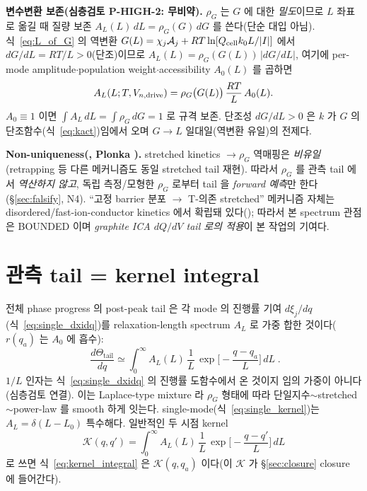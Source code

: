 \textbf{변수변환 보존(심층검토 P-HIGH-2: 무비약).} $\rho_G$ 는 $G$ 에 대한 \emph{밀도}이므로 $L$ 좌표로
옮길 때 질량 보존 $A_L(L)\,dL=\rho_G(G)\,dG$ 를 쓴다(단순 대입 아님). 식~\eqref{eq:L_of_G} 의 역변환
$G(L)=\chi_j\mathcal A_j+RT\ln[Q_{\mathrm{cell}} k_0 L/|I|]$ 에서 $dG/dL=RT/L>0$(단조)이므로
$A_L(L)=\rho_G(G(L))\,|dG/dL|$, 여기에 per-mode amplitude$\cdot$population weight$\cdot$accessibility
$A_0(L)$ 를 곱하면
\begin{equation}
A_L(L;T,V_{n,\mathrm{drive}})=\rho_G\big(G(L)\big)\,\frac{RT}{L}\,A_0(L).
\label{eq:spectrum}
\end{equation}
$A_0\equiv1$ 이면 $\int A_L\,dL=\int\rho_G\,dG=1$ 로 규격 보존. 단조성 $dG/dL>0$ 은 $k$ 가 $G$ 의
단조함수(식~\eqref{eq:kact})임에서 오며 $G\!\to\!L$ 일대일(역변환 유일)의 전제다.
\begin{boundbox}
\textbf{Non-uniqueness(, Plonka \cite{plonka2001}).} stretched kinetics $\to\rho_G$ 역매핑은
\emph{비유일}(retrapping 등 다른 메커니즘도 동일 stretched tail 재현). 따라서 $\rho_G$ 를 관측 tail 에서
\emph{역산하지 않고}, 독립 측정/모형한 $\rho_G$ 로부터 tail 을 \emph{forward 예측}만 한다(\S\ref{sec:falsify}, N4).
``고정 barrier 분포 $\to$ T-의존 stretched'' 메커니즘 자체는 disordered/fast-ion-conductor kinetics 에서
확립돼 있다(\cite{macdonald2000,lindsey1980}); 따라서 본 spectrum 관점은 BOUNDED 이며 \emph{graphite ICA
$dQ/dV$ tail 로의 적용}이 본 작업의 기여다.
\end{boundbox}

\section{관측 tail = kernel integral}\label{sec:kernel}
전체 phase progress 의 post-peak tail 은 각 mode 의 진행률 기여 $d\xi_j/dq$(식~\eqref{eq:single_dxidq})를
relaxation-length spectrum $A_L$ 로 가중 합한 것이다($r(q_a)$ 는 $A_0$ 에 흡수):
\begin{equation}
\boxed{\;\frac{d\Theta_\mathrm{tail}}{dq}\simeq\int_0^\infty A_L(L)\,\frac1L\,
\exp\!\Big[-\frac{q-q_a}{L}\Big]\,dL\;.}
\label{eq:kernel_integral}
\end{equation}
$1/L$ 인자는 식~\eqref{eq:single_dxidq} 의 진행률 도함수에서 온 것이지 임의 가중이 아니다(심층검토 연결).
이는 Laplace-type mixture 라 $\rho_G$ 형태에 따라 단일지수$\sim$stretched$\sim$power-law 를 smooth 하게
잇는다. single-mode(식~\eqref{eq:single_kernel})는 $A_L=\delta(L-L_0)$ 특수해다. 일반적인 두 시점 kernel
\begin{equation}
\mathcal K(q,q')=\int_0^\infty A_L(L)\,\frac1L\,\exp\!\Big[-\frac{q-q'}{L}\Big]\,dL
\label{eq:Kdef}
\end{equation}
로 쓰면 식~\eqref{eq:kernel_integral} 은 $\mathcal K(q,q_a)$ 이다(이 $\mathcal K$ 가 \S\ref{sec:closure} closure 에 들어간다).

